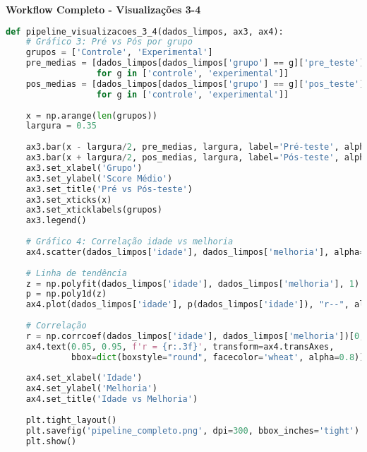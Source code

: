 \begin{examplebox}
\textbf{Workflow Completo - Visualizações 3-4}

\begin{lstlisting}[language=Python]
def pipeline_visualizacoes_3_4(dados_limpos, ax3, ax4):
    # Gráfico 3: Pré vs Pós por grupo
    grupos = ['Controle', 'Experimental']
    pre_medias = [dados_limpos[dados_limpos['grupo'] == g]['pre_teste'].mean() 
                  for g in ['controle', 'experimental']]
    pos_medias = [dados_limpos[dados_limpos['grupo'] == g]['pos_teste'].mean() 
                  for g in ['controle', 'experimental']]
    
    x = np.arange(len(grupos))
    largura = 0.35
    
    ax3.bar(x - largura/2, pre_medias, largura, label='Pré-teste', alpha=0.8)
    ax3.bar(x + largura/2, pos_medias, largura, label='Pós-teste', alpha=0.8)
    ax3.set_xlabel('Grupo')
    ax3.set_ylabel('Score Médio')
    ax3.set_title('Pré vs Pós-teste')
    ax3.set_xticks(x)
    ax3.set_xticklabels(grupos)
    ax3.legend()
    
    # Gráfico 4: Correlação idade vs melhoria
    ax4.scatter(dados_limpos['idade'], dados_limpos['melhoria'], alpha=0.6)
    
    # Linha de tendência
    z = np.polyfit(dados_limpos['idade'], dados_limpos['melhoria'], 1)
    p = np.poly1d(z)
    ax4.plot(dados_limpos['idade'], p(dados_limpos['idade']), "r--", alpha=0.8)
    
    # Correlação
    r = np.corrcoef(dados_limpos['idade'], dados_limpos['melhoria'])[0, 1]
    ax4.text(0.05, 0.95, f'r = {r:.3f}', transform=ax4.transAxes,
             bbox=dict(boxstyle="round", facecolor='wheat', alpha=0.8))
    
    ax4.set_xlabel('Idade')
    ax4.set_ylabel('Melhoria')
    ax4.set_title('Idade vs Melhoria')
    
    plt.tight_layout()
    plt.savefig('pipeline_completo.png', dpi=300, bbox_inches='tight')
    plt.show()
\end{lstlisting}
\end{examplebox}

